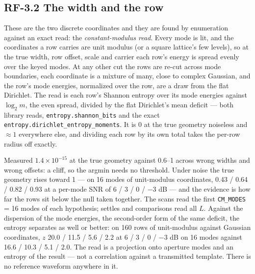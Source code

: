 \documentclass[10pt,letterpaper,twocolumn]{article}
\begin{document}
\subsection{RF-3.2 The width and the row}\label{rf-32-the-width-and-the-row}

These are the two discrete coordinates and they are found by enumeration against an exact read: the \emph{constant-modulus read}. Every mode is lit, and the coordinates a row carries are unit modulus (or a square lattice's few levels), so at the true width, row offset, scale and carrier each row's energy is spread evenly over the keyed modes. At any other cut the rows are re-cut across mode boundaries, each coordinate is a mixture of many, close to complex Gaussian, and the row's mode energies, normalized over the row, are a draw from the flat Dirichlet. The read is each row's Shannon entropy over its mode energies against \(\log_2 m\), the even spread, divided by the flat Dirichlet's mean deficit --- both library reads, \texttt{entropy.\allowbreak{}shannon\_\allowbreak{}bits} and the exact \texttt{entropy.\allowbreak{}dirichlet\_\allowbreak{}entropy\_\allowbreak{}moments}. It is 0 at the true geometry noiseless and \(\approx 1\) everywhere else, and dividing each row by its own total takes the per-row radius off exactly.

Measured \(1.4\times10^{-15}\) at the true geometry against 0.6--1 across wrong widths and wrong offsets: a cliff, so the argmin needs no threshold. Under noise the true geometry rises toward 1 --- on 16 modes of unit-modulus coordinates, 0.43 / 0.64 / 0.82 / 0.93 at a per-mode SNR of 6 / 3 / 0 / −3 dB --- and the evidence is how far the rows sit below the null taken together. The scans read the first \texttt{CM\_\allowbreak{}MODES} = 16 modes of each hypothesis; settles and comparisons read all \(L\). Against the dispersion of the mode energies, the second-order form of the same deficit, the entropy separates as well or better: on 160 rows of unit-modulus against Gaussian coordinates, \(z\) 20.0 / 11.5 / 5.6 / 2.2 at 6 / 3 / 0 / −3 dB on 16 modes against 16.6 / 10.3 / 5.1 / 2.0. The read is a projection onto aperture modes and an entropy of the result --- not a correlation against a transmitted template. There is no reference waveform anywhere in it.
\end{document}
